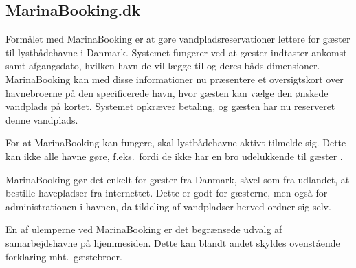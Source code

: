 \subsection{MarinaBooking.dk} %
\label{sub:MarinaBooking.dk}

Formålet med MarinaBooking \cite{marinabooking} er at gøre vandpladsreservationer lettere for gæster til lystbådehavne i Danmark. Systemet fungerer ved at gæster indtaster ankomst- samt afgangsdato, hvilken havn de vil lægge til og deres båds dimensioner. MarinaBooking kan med disse informationer nu præsentere et oversigtskort over havnebroerne på den specificerede havn, hvor gæsten kan vælge den ønskede vandplads på kortet. Systemet opkræver betaling, og gæsten har nu reserveret denne vandplads.

For at MarinaBooking kan fungere, skal lystbådehavne aktivt tilmelde sig. Dette kan ikke alle havne gøre, f.eks.\ fordi de ikke har en bro udelukkende til gæster . 

MarinaBooking gør det enkelt for gæster fra Danmark, såvel som fra udlandet, at bestille havepladser fra internettet. Dette er godt for gæsterne, men også for administrationen i havnen, da tildeling af vandpladser herved ordner sig selv.

En af ulemperne ved MarinaBooking er det begrænsede udvalg af samarbejdshavne på hjemmesiden. Dette kan blandt andet skyldes ovenstående forklaring mht.\ gæstebroer.





